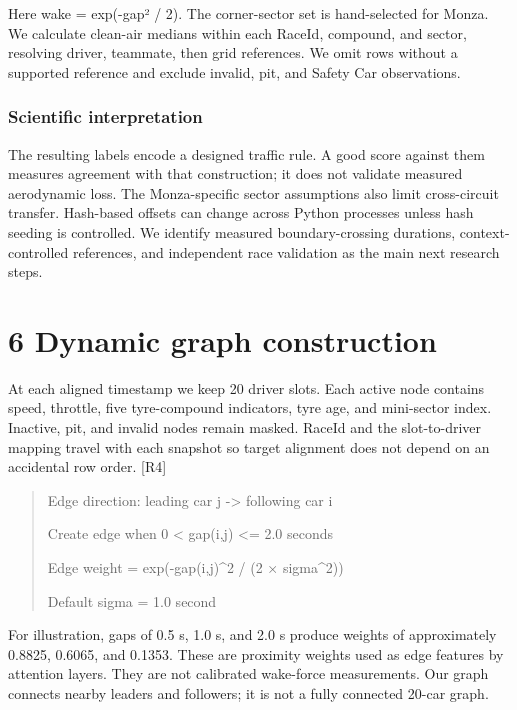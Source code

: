 \documentclass[11pt,a4paper,oneside]{report}
\begin{document}
Here wake = exp(-gap² / 2). The corner-sector set is hand-selected for Monza. We calculate clean-air medians within each RaceId, compound, and sector, resolving driver, teammate, then grid references. We omit rows without a supported reference and exclude invalid, pit, and Safety Car observations.

\subsection*{Scientific interpretation}

The resulting labels encode a designed traffic rule. A good score against them measures agreement with that construction; it does not validate measured aerodynamic loss. The Monza-specific sector assumptions also limit cross-circuit transfer. Hash-based offsets can change across Python processes unless hash seeding is controlled. We identify measured boundary-crossing durations, context-controlled references, and independent race validation as the main next research steps.

\clearpage

\clearpage\chapter*{6 Dynamic graph construction}

At each aligned timestamp we keep 20 driver slots. Each active node contains speed, throttle, five tyre-compound indicators, tyre age, and mini-sector index. Inactive, pit, and invalid nodes remain masked. RaceId and the slot-to-driver mapping travel with each snapshot so target alignment does not depend on an accidental row order. [R4]

\begin{quote}\small\ttfamily Edge direction: leading car j -> following car i\par Create edge when 0 < gap(i,j) <= 2.0 seconds\par Edge weight = exp(-gap(i,j)^2 / (2 × sigma^2))\par Default sigma = 1.0 second\end{quote}

For illustration, gaps of 0.5 s, 1.0 s, and 2.0 s produce weights of approximately 0.8825, 0.6065, and 0.1353. These are proximity weights used as edge features by attention layers. They are not calibrated wake-force measurements. Our graph connects nearby leaders and followers; it is not a fully connected 20-car graph.
\end{document}
